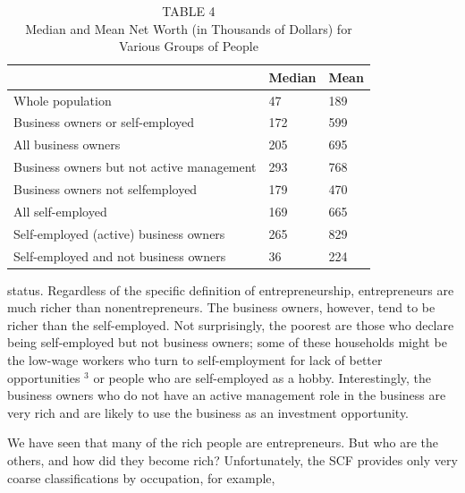 \documentclass[10pt]{article}
\begin{document}
\begin{table}[h]
\begin{center}
\captionsetup{labelformat=empty}
\caption{TABLE 4\\
Median and Mean Net Worth (in Thousands of Dollars) for Various Groups of People}
\begin{tabular}{|l|l|l|}
\hline
 & Median & Mean \\
\hline
Whole population & 47 & 189 \\
\hline
Business owners or self-employed & 172 & 599 \\
\hline
All business owners & 205 & 695 \\
\hline
Business owners but not active management & 293 & 768 \\
\hline
Business owners not selfemployed & 179 & 470 \\
\hline
All self-employed & 169 & 665 \\
\hline
Self-employed (active) business owners & 265 & 829 \\
\hline
Self-employed and not business owners & 36 & 224 \\
\hline
\end{tabular}
\end{center}
\end{table}

status. Regardless of the specific definition of entrepreneurship, entrepreneurs are much richer than nonentrepreneurs. The business owners, however, tend to be richer than the self-employed. Not surprisingly, the poorest are those who declare being self-employed but not business owners; some of these households might be the low-wage workers who turn to self-employment for lack of better opportunities ${ }^{3}$ or people who are self-employed as a hobby. Interestingly, the business owners who do not have an active management role in the business are very rich and are likely to use the business as an investment opportunity.

We have seen that many of the rich people are entrepreneurs. But who are the others, and how did they become rich? Unfortunately, the SCF provides only very coarse classifications by occupation, for example,
\end{document}
